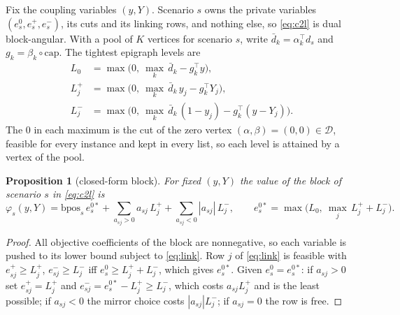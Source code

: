 \documentclass[11pt]{article}
\newtheorem{proposition}{Proposition}
\newcommand{\bpos}{\mathrm{bpos}}
\newcommand{\capa}{\mathrm{cap}}
\newcommand{\ad}{\bar d}
\newcommand{\D}{\mathcal{D}}
\newcommand{\T}{^{\top}}
\begin{document}
Fix the coupling variables $(y,Y)$. Scenario $s$ owns the private variables $(e^0_s, e^+_s, e^-_s)$, its cuts and
its linking rows, and nothing else, so \eqref{eq:c2l} is dual block-angular. With a pool of $K$ vertices for scenario
$s$, write $\ad_k = \alpha_k\T d_s$ and $g_k = \beta_k\circ\capa$. The tightest epigraph levels are
\begin{equation}\label{eq:levels}
\begin{aligned}
L_0 &= \max\Big(0,\ \max_k\, \ad_k - g_k\T y\Big),\\
L^+_j &= \max\Big(0,\ \max_k\, \ad_k\, y_j - g_k\T Y_j\Big),\\
L^-_j &= \max\Big(0,\ \max_k\, \ad_k\,(1-y_j) - g_k\T(y-Y_j)\Big).
\end{aligned}
\end{equation}
The $0$ in each maximum is the cut of the zero vertex $(\alpha,\beta) = (0,0)\in\D$, feasible for every instance and
kept in every list, so each level is attained by a vertex of the pool.

\begin{proposition}[closed-form block]\label{prop:block}
For fixed $(y,Y)$ the value of the block of scenario $s$ in \eqref{eq:c2l} is
\begin{equation}\label{eq:phi}
\varphi_s(y,Y) = \bpos_s\, e^{0*}_s + \sum_{a_{sj}>0} a_{sj}\,L^+_j + \sum_{a_{sj}<0}|a_{sj}|\,L^-_j,\qquad
e^{0*}_s = \max\Big(L_0,\ \max_j\, L^+_j + L^-_j\Big).
\end{equation}
\end{proposition}
\begin{proof}
All objective coefficients of the block are nonnegative, so each variable is pushed to its lower bound subject to
\eqref{eq:link}. Row $j$ of \eqref{eq:link} is feasible with $e^+_{sj}\ge L^+_j$, $e^-_{sj}\ge L^-_j$ iff
$e^0_s\ge L^+_j + L^-_j$, which gives $e^{0*}_s$. Given $e^0_s = e^{0*}_s$: if $a_{sj}>0$ set $e^+_{sj} = L^+_j$ and
$e^-_{sj} = e^{0*}_s - L^+_j \ge L^-_j$, which costs $a_{sj}L^+_j$ and is the least possible; if $a_{sj}<0$ the
mirror choice costs $|a_{sj}|L^-_j$; if $a_{sj}=0$ the row is free.
\end{proof}
\end{document}
